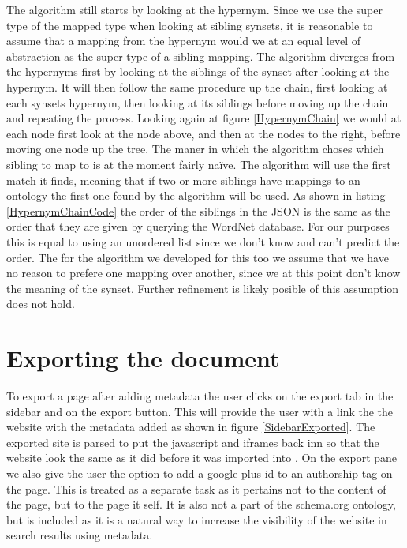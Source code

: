 The algorithm still starts by looking at the hypernym.
Since we use the super type of the mapped type when looking at sibling synsets,
it is reasonable to assume that a mapping from the hypernym would we at an equal level of abstraction as the
super type of a sibling mapping.
The algorithm diverges from the hypernyms first by looking at the siblings of the synset after looking at the hypernym.
It will then follow the same procedure up the chain, first looking at each synsets hypernym,
then looking at its siblings before moving up the chain and repeating the process.
Looking again at figure \ref{HypernymChain} we would at each node first look at the node above,
and then at the nodes to the right, before moving one node up the tree.
The maner in which the algorithm choses which sibling to map to is at the moment fairly naïve.
The algorithm will use the first match it finds,
meaning that if two or more siblings have mappings to an ontology the first one found by the algorithm will be used.
As shown in listing \ref{HypernymChainCode} the order of the siblings in the JSON is the same as the order that they
are given by querying the WordNet database.
For our purposes this is equal to using an unordered list since we don't know and can't predict the order.
The for the algorithm we developed for this too we assume  that we have no reason to prefere one mapping over another,
since we at this point don't know the meaning of the synset.
Further refinement is likely posible of this assumption does not hold.

\section{Exporting the document}
To export a page after adding metadata the user clicks on the export tab in the sidebar and on the export button.
This will provide the user with a link the the website with the metadata added as shown in figure \ref{SidebarExported}.
The exported site is parsed to put the javascript and iframes back inn so that the website look the same as it did
before it was imported into \theartefact.
On the export pane we also give the user the option to add a google plus id to an authorship tag on the page.
This is treated as a separate task as it pertains not to the content of the page, but to the page it self.
It is also not a part of the schema.org ontology, but is included as it is a natural way to increase the visibility of
the website in search results using metadata.

